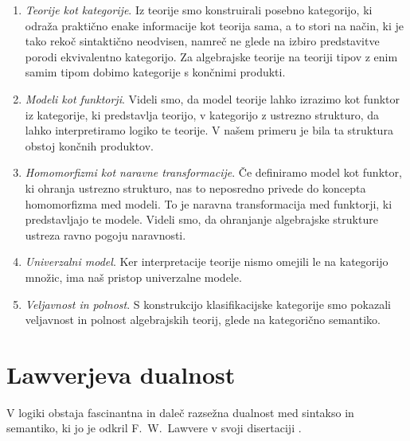 \documentclass[../kategoricna_logika.tex]{subfiles}
\begin{document}
\begin{enumerate}
\item \emph{Teorije kot kategorije}. Iz teorije smo konstruirali posebno
  kategorijo, ki odraža praktično enake informacije kot teorija sama,
  a to stori na način, ki je tako rekoč sintaktično neodvisen, namreč
  ne glede na izbiro predstavitve porodi ekvivalentno kategorijo.
  Za algebrajske teorije na teoriji tipov z enim samim tipom dobimo
  kategorije s končnimi produkti.
\item \emph{Modeli kot funktorji}. Videli smo, da model teorije lahko izrazimo
  kot funktor iz kategorije, ki predstavlja teorijo, v kategorijo z ustrezno
  strukturo, da lahko interpretiramo logiko te teorije. V našem primeru
  je bila ta struktura obstoj končnih produktov. 
\item \emph{Homomorfizmi kot naravne transformacije}. Če definiramo model
  kot funktor, ki ohranja ustrezno strukturo, nas to neposredno privede
  do koncepta homomorfizma med modeli.
  To je naravna transformacija med funktorji, ki
  predstavljajo te modele. Videli smo, da ohranjanje algebrajske strukture
  ustreza ravno pogoju naravnosti.
\item \emph{Univerzalni model}. Ker interpretacije teorije nismo omejili le na kategorijo množic,
  ima naš pristop univerzalne modele.
\item \emph{Veljavnost in polnost}. S konstrukcijo klasifikacijske kategorije
  smo pokazali veljavnost in polnost algebrajskih teorij, glede na
  kategorično semantiko.
\end{enumerate}
% 
%
%
\section{Lawverjeva dualnost}
%
V logiki obstaja fascinantna in daleč razsežna dualnost med sintakso
in semantiko,
ki jo je odkril F.~W.~Lawvere v svoji disertaciji \cite{lawvere1963functorial}.
\end{document}
